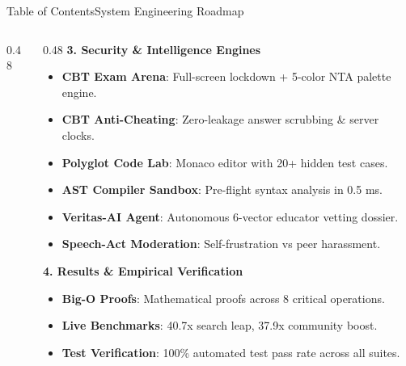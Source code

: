 \documentclass[aspectratio=169,10pt]{beamer}
\begin{document}
\begin{frame}[t]{Table of Contents}{System Engineering Roadmap}
\begin{columns}[t]
\begin{column}{0.48\textwidth}
\begin{itemize}
      \end{itemize}
    \end{column}
    \begin{column}{0.48\textwidth}
      {\fontsize{8.0}{9.5}\selectfont\textbf{\textcolor{KoinexaRed}{3. Security \& Intelligence Engines}}}\par\vspace{0.5pt}
      \begin{itemize}\setlength{\itemsep}{-1.0pt}
        \item {\fontsize{6.8}{8.0}\selectfont \textbf{CBT Exam Arena}: Full-screen lockdown + 5-color NTA palette engine.}
        \item {\fontsize{6.8}{8.0}\selectfont \textbf{CBT Anti-Cheating}: Zero-leakage answer scrubbing \& server clocks.}
        \item {\fontsize{6.8}{8.0}\selectfont \textbf{Polyglot Code Lab}: Monaco editor with 20+ hidden test cases.}
        \item {\fontsize{6.8}{8.0}\selectfont \textbf{AST Compiler Sandbox}: Pre-flight syntax analysis in 0.5 ms.}
        \item {\fontsize{6.8}{8.0}\selectfont \textbf{Veritas-AI Agent}: Autonomous 6-vector educator vetting dossier.}
        \item {\fontsize{6.8}{8.0}\selectfont \textbf{Speech-Act Moderation}: Self-frustration vs peer harassment.}
      \end{itemize}
      \vspace{0.04cm}
      {\fontsize{8.0}{9.5}\selectfont\textbf{\textcolor{KoinexaOrange}{4. Results \& Empirical Verification}}}\par\vspace{0.5pt}
      \begin{itemize}\setlength{\itemsep}{-1.0pt}
        \item {\fontsize{6.8}{8.0}\selectfont \textbf{Big-O Proofs}: Mathematical proofs across 8 critical operations.}
        \item {\fontsize{6.8}{8.0}\selectfont \textbf{Live Benchmarks}: 40.7x search leap, 37.9x community boost.}
        \item {\fontsize{6.8}{8.0}\selectfont \textbf{Test Verification}: 100\% automated test pass rate across all suites.}
      \end{itemize}
    \end{column}
  \end{columns}
\end{frame}
\end{document}
